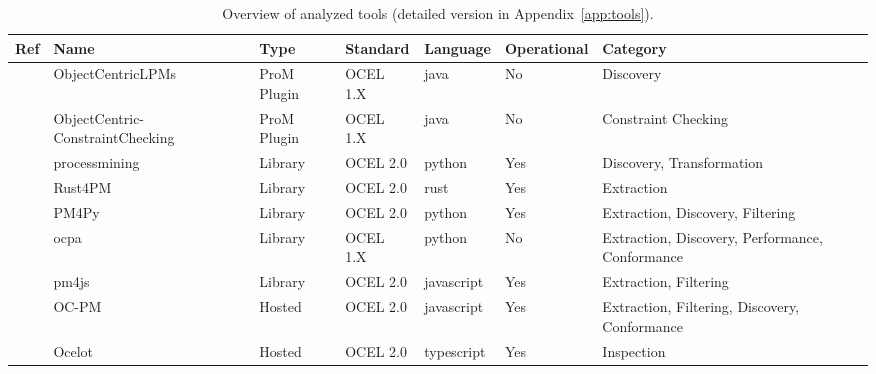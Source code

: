 \begin{table}
	\caption{Overview of analyzed tools (detailed version in Appendix~\ref{app:tools}).}
	\label{tab:tool-overview}
	\small
	\centering
	\begin{tabular}{|l|p{4cm}|l|p{2cm}|l|l|p{4.5cm}|}
		\hline
		Ref                       & Name                             & Type         & Standard             & Language            & Operational & Category                                               \\ \hline
		\cite{oclpm}              & ObjectCentricLPMs                & ProM Plugin  & OCEL 1.X             & java                & No          & Discovery                                              \\ \hline
		\cite{constraintchecking} & ObjectCentric-ConstraintChecking & ProM Plugin  & OCEL 1.X             & java                & No          & Constraint Checking                                    \\ \hline
		\cite{olap}               & processmining                    & Library      & OCEL 2.0             & python              & Yes         & Discovery,  Transformation                             \\ \hline
		\cite{rust4pm}            & Rust4PM                          & Library      & OCEL 2.0             & rust                & Yes         & Extraction                                             \\ \hline
		\cite{pm4py}              & PM4Py                            & Library      & OCEL 2.0             & python              & Yes         & Extraction, Discovery, Filtering                       \\ \hline
		\cite{ocpa}               & ocpa                             & Library      & OCEL 1.X             & python              & No          & Extraction, Discovery, Performance, Conformance        \\ \hline
		\cite{ocel2}              & pm4js                            & Library      & OCEL 2.0             & javascript          & Yes         & Extraction, Filtering                                  \\ \hline
		\cite{ocpm}               & OC-PM                            & Hosted       & OCEL 2.0             & javascript          & Yes         & Extraction, Filtering, Discovery, Conformance          \\ \hline
		\cite{ocel2}              & Ocelot                           & Hosted       & OCEL 2.0             & typescript          & Yes         & Inspection                                             \\ \hline

\end{tabular}
\end{table}
